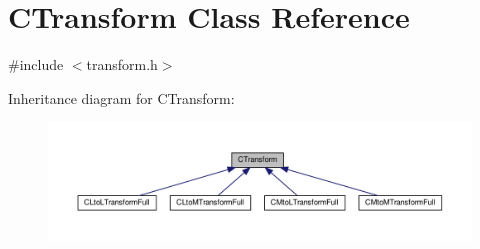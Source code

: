 \hypertarget{classCTransform}{\section{C\-Transform Class Reference}
\label{classCTransform}
}


{\ttfamily \#include $<$transform.\-h$>$}



Inheritance diagram for C\-Transform\-:\nopagebreak
\begin{figure}[H]
\begin{center}
\leavevmode
\includegraphics[width=350pt]{classCTransform__inherit__graph}
\end{center}
\end{figure}
